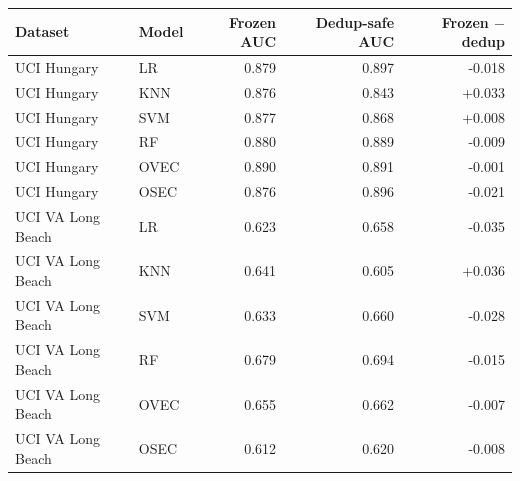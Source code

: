 \begin{tabular}{llrrr}
\toprule
Dataset & Model & Frozen AUC & Dedup-safe AUC & Frozen $-$ dedup \\
\midrule
UCI Hungary & LR & 0.879 & 0.897 & -0.018 \\
UCI Hungary & KNN & 0.876 & 0.843 & +0.033 \\
UCI Hungary & SVM & 0.877 & 0.868 & +0.008 \\
UCI Hungary & RF & 0.880 & 0.889 & -0.009 \\
UCI Hungary & OVEC & 0.890 & 0.891 & -0.001 \\
UCI Hungary & OSEC & 0.876 & 0.896 & -0.021 \\
UCI VA Long Beach & LR & 0.623 & 0.658 & -0.035 \\
UCI VA Long Beach & KNN & 0.641 & 0.605 & +0.036 \\
UCI VA Long Beach & SVM & 0.633 & 0.660 & -0.028 \\
UCI VA Long Beach & RF & 0.679 & 0.694 & -0.015 \\
UCI VA Long Beach & OVEC & 0.655 & 0.662 & -0.007 \\
UCI VA Long Beach & OSEC & 0.612 & 0.620 & -0.008 \\
\bottomrule
\end{tabular}

